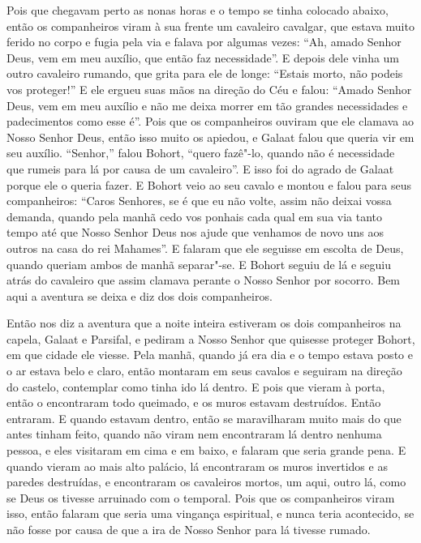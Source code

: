 Pois que chegavam perto as nonas horas e o tempo se tinha colocado abaixo, então
os companheiros viram à sua frente um cavaleiro cavalgar, que estava muito
ferido no corpo e fugia pela via e falava por algumas vezes: “Ah, amado Senhor
Deus, vem em meu auxílio, que então faz necessidade”. E depois dele vinha um
outro cavaleiro rumando, que grita para ele de longe: “Estais morto, não podeis
vos proteger!” E ele ergueu suas mãos na direção do Céu e falou: “Amado Senhor
Deus, vem em meu auxílio e não me deixa morrer em tão grandes necessidades e
padecimentos como esse é”. Pois que os companheiros ouviram que ele clamava ao
Nosso Senhor Deus, então isso muito os apiedou, e Galaat falou que queria vir
em seu auxílio. “Senhor,” falou Bohort, “quero fazê"-lo, quando não é
necessidade que rumeis para lá por causa de um cavaleiro”. E isso foi do agrado
de Galaat porque ele o queria fazer. E Bohort veio ao seu cavalo e montou e
falou para seus companheiros: “Caros Senhores, se é que eu não volte, assim não
deixai vossa demanda, quando pela manhã cedo vos ponhais cada qual em sua via
tanto tempo até que Nosso Senhor Deus nos ajude que venhamos de novo uns aos
outros na casa do rei Mahames”. E falaram que ele seguisse em escolta de Deus,
quando queriam ambos de manhã separar"-se. E Bohort seguiu de lá e seguiu atrás
do cavaleiro que assim clamava perante o Nosso Senhor por socorro. Bem aqui a
aventura se deixa e diz dos dois companheiros.

Então nos diz a aventura que a noite inteira estiveram os dois companheiros na
capela, Galaat e Parsifal, e pediram a Nosso Senhor que quisesse proteger
Bohort, em que cidade ele viesse. Pela manhã, quando já era dia e o
tempo estava posto e o ar estava belo e claro, então montaram em seus cavalos e
seguiram na direção do castelo, contemplar como tinha ido lá dentro. E pois que
vieram à porta, então o encontraram todo queimado, e os muros estavam
destruídos. Então entraram. E quando estavam dentro, então se maravilharam
muito mais do que antes tinham feito, quando não viram nem encontraram lá
dentro nenhuma pessoa, e eles visitaram em cima e em baixo, e falaram que seria
grande pena. E quando vieram ao mais alto palácio, lá encontraram os muros
invertidos e as paredes destruídas, e encontraram os cavaleiros mortos, um
aqui, outro lá, como se Deus os tivesse arruinado com o temporal. Pois que os
companheiros viram isso, então falaram que seria uma vingança espiritual, e
nunca teria acontecido, se não fosse por causa de que a ira de Nosso Senhor
para lá tivesse rumado.

